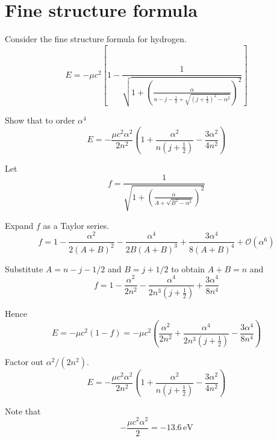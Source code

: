 

\section*{Fine structure formula}

Consider the fine structure formula for hydrogen.
\begin{equation*}
E=-\mu c^2\left[1-\frac{1}{\sqrt{\displaystyle1
+\left(\frac{\alpha}{n-j-\frac{1}{2}+\sqrt{\left(j+\frac{1}{2}\right)^2-\alpha^2}}\right)^2}}\right]
\end{equation*}

Show that to order $\alpha^4$
\begin{equation*}
E=-\frac{\mu c^2\alpha^2}{2n^2}
\left(1+\frac{\alpha^2}{n\left(j+\frac{1}{2}\right)}-\frac{3\alpha^2}{4n^2}\right)
\end{equation*}

Let
\begin{equation*}
f=\frac{1}{\sqrt{\displaystyle1+\left(\frac{\alpha}{A+\sqrt{B^2-\alpha^2}}\right)^2}}
\end{equation*}

Expand $f$ as a Taylor series.
\begin{equation*}
f=1-\frac{\alpha^2}{2(A+B)^2}-\frac{\alpha^4}{2B(A+B)^3}+\frac{3\alpha^4}{8(A+B)^4}+\mathcal O(\alpha^6)
\end{equation*}

Substitute $A=n-j-1/2$ and $B=j+1/2$ to obtain $A+B=n$ and
\begin{equation*}
f=1-\frac{\alpha^2}{2n^2}-\frac{\alpha^4}{2n^3\left(j+\frac{1}{2}\right)}+\frac{3\alpha^4}{8n^4}
\tag{1}
\end{equation*}

Hence
\begin{equation*}
E=-\mu c^2(1-f)=-\mu c^2\left(\frac{\alpha^2}{2n^2}
+\frac{\alpha^4}{2n^3\left(j+\frac{1}{2}\right)}-\frac{3\alpha^4}{8n^4}\right)
\end{equation*}

Factor out $\alpha^2/(2n^2)$.
\begin{equation*}
E=-\frac{\mu c^2\alpha^2}{2n^2}
\left(1+\frac{\alpha^2}{n\left(j+\frac{1}{2}\right)}-\frac{3\alpha^2}{4n^2}\right)
\tag{2}
\end{equation*}

Note that
\begin{equation*}
-\frac{\mu c^2\alpha^2}{2}=-13.6\,\text{eV}
\end{equation*}


